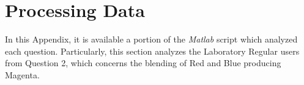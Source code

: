 
\chapter{Processing Data}
\label{appendix:matlab_example}
%
In this Appendix, it is available a portion of the \emph{Matlab} script which analyzed each question. Particularly, this
section analyzes the Laboratory Regular users from Question 2, which concerns the blending of Red and Blue producing Magenta. \\
%

